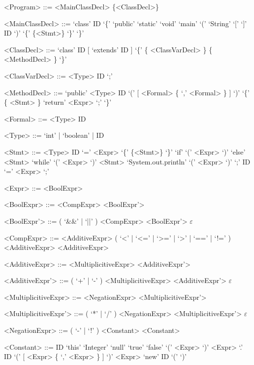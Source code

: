 \documentclass{report}
\begin{document}
\setlength{\grammarparsep}{8pt} %
\setlength{\grammarindent}{12em} %

\begin{grammar}

<Program> ::= <MainClassDecl> \{<ClassDecl>\}

<MainClassDecl> ::= `class' ID `\{' `public' `static' `void' `main' `(' `String' `[' `]' ID `)' `\{' \{<Stmt>\} `\}' `\}'

<ClassDecl> ::= `class' ID [ `extends' ID ] `\{' \{ <ClassVarDecl> \} \{ <MethodDecl> \} `\}'

<ClassVarDecl> ::= <Type> ID `;'

<MethodDecl> ::= `public' <Type> ID `(' [ <Formal> \{ `,' <Formal> \} ] `)' `\{' \{ <Stmt> \} `return' <Expr> `;' `\}'

<Formal> ::= <Type> ID

<Type> ::= `int' | `boolean' | ID

<Stmt> ::= <Type> ID `=' <Expr>
\alt `\{' \{<Stmt>\} `\}'
\alt `if' `(' <Expr> `)' `else' <Stmt>
\alt `while' `(' <Expr> `)' <Stmt>
\alt `System.out.println' `(' <Expr> `)' `;'
\alt ID `=' <Expr> `;'

<Expr> ::= <BoolExpr>

<BoolExpr> ::= <CompExpr> <BoolExpr'>

<BoolExpr'> ::= ( `&&' | `||' ) <CompExpr> <BoolExpr'>
\alt $\varepsilon$

<CompExpr> ::= <AdditiveExpr> ( `<' | `<=' | `>=' | `>' | `==' | `!=' ) <AdditiveExpr>
\alt <AdditiveExpr>

<AdditiveExpr> ::= <MultiplicitiveExpr> <AdditiveExpr'>

<AdditiveExpr'> ::= ( `+' | `-' ) <MultiplicitiveExpr> <AdditiveExpr'>
\alt $\varepsilon$


<MultiplicitiveExpr> ::= <NegationExpr> <MultiplicitiveExpr'>

<MultiplicitiveExpr'> ::= ( `*' | `/' ) <NegationExpr> <MultiplicitiveExpr'>
\alt $\varepsilon$

<NegationExpr> ::= ( `-' | `!' ) <Constant>
\alt <Constant>

<Constant> ::= ID
\alt `this'
\alt `Integer'
\alt `null'
\alt `true'
\alt `false'
\alt `(' <Expr> `)'
\alt <Expr> `.' ID `(' [ <Expr> \{ `,' <Expr> \} ] `)'
\alt <Expr> `new' ID `(' `)'

\end{grammar}
\end{document}
